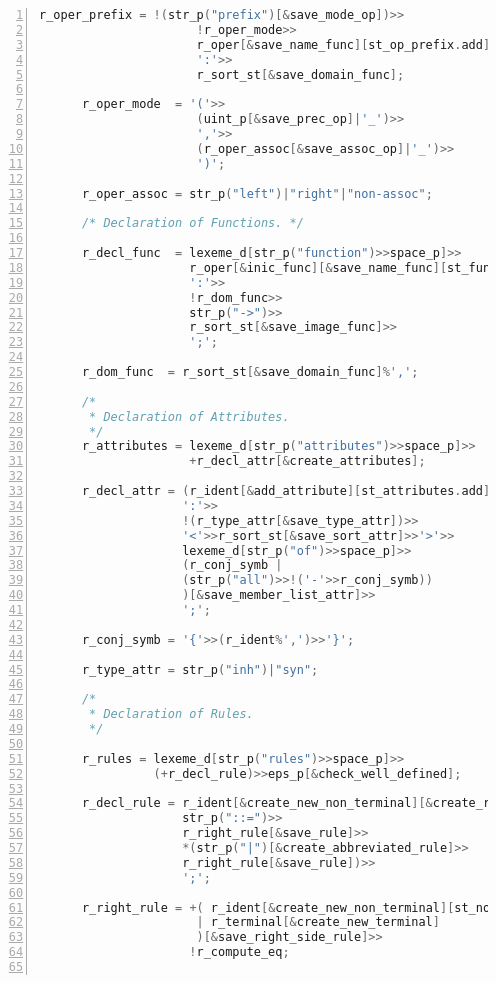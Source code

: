 \begin{center}
\begin{lstlisting}[numbers=left,basicstyle=\tiny,language=C++]
      r_oper_prefix = !(str_p("prefix")[&save_mode_op])>>
                      !r_oper_mode>>
                      r_oper[&save_name_func][st_op_prefix.add]>>
                      ':'>>
                      r_sort_st[&save_domain_func];

      r_oper_mode  = '('>>
                      (uint_p[&save_prec_op]|'_')>>
                      ','>>
                      (r_oper_assoc[&save_assoc_op]|'_')>>
                      ')';

      r_oper_assoc = str_p("left")|"right"|"non-assoc";

      /* Declaration of Functions. */

      r_decl_func  = lexeme_d[str_p("function")>>space_p]>>
                     r_oper[&inic_func][&save_name_func][st_functions.add]>>
                     ':'>>
                     !r_dom_func>>
                     str_p("->")>>
                     r_sort_st[&save_image_func]>>
                     ';';

      r_dom_func  = r_sort_st[&save_domain_func]%',';

      /*
       * Declaration of Attributes.
       */
      r_attributes = lexeme_d[str_p("attributes")>>space_p]>>
                     +r_decl_attr[&create_attributes];

      r_decl_attr = (r_ident[&add_attribute][st_attributes.add]%',')>>
                    ':'>>
                    !(r_type_attr[&save_type_attr])>>
                    '<'>>r_sort_st[&save_sort_attr]>>'>'>>
                    lexeme_d[str_p("of")>>space_p]>>
                    (r_conj_symb |
                    (str_p("all")>>!('-'>>r_conj_symb))
                    )[&save_member_list_attr]>>
                    ';';

      r_conj_symb = '{'>>(r_ident%',')>>'}';

      r_type_attr = str_p("inh")|"syn";

      /*
       * Declaration of Rules.
       */

      r_rules = lexeme_d[str_p("rules")>>space_p]>>
                (+r_decl_rule)>>eps_p[&check_well_defined];

      r_decl_rule = r_ident[&create_new_non_terminal][&create_rule][st_non_terminal.add]>>
                    str_p("::=")>>
                    r_right_rule[&save_rule]>>
                    *(str_p("|")[&create_abbreviated_rule]>>
                    r_right_rule[&save_rule])>>
                    ';';

      r_right_rule = +( r_ident[&create_new_non_terminal][st_non_terminal.add]
                      | r_terminal[&create_new_terminal]
                      )[&save_right_side_rule]>>
                     !r_compute_eq;


\end{lstlisting}
\end{center}
